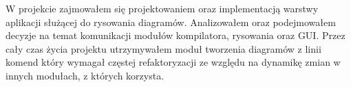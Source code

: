 W projekcie zajmowałem się projektowaniem oraz implementacją warstwy aplikacji służącej do rysowania diagramów. Analizowałem oraz podejmowałem decyzje na temat komunikacji modułów kompilatora, rysowania oraz GUI. Przez cały czas życia projektu utrzymywałem moduł tworzenia diagramów z linii komend który wymagał częstej refaktoryzacji ze względu na dynamikę zmian w innych modułach, z których korzysta.